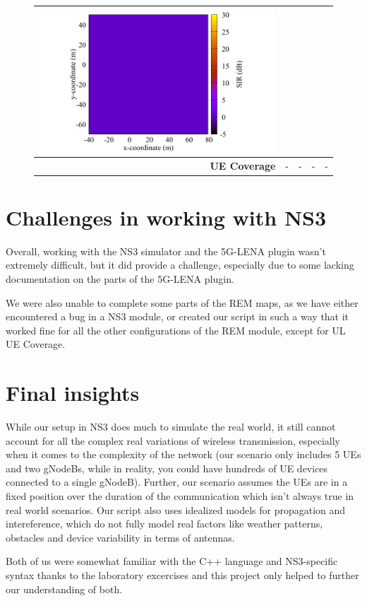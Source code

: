 \documentclass[10pt,a4]{article}
\begin{document}
\begin{figure}[h!]
{\begin{tabular}{r|cccc}
    \includegraphics[width=0.25\linewidth]{../kpm-plots/nr-rem-UL_COVERAGE_AREA-sir.pdf} \\
    \hline
    \textbf{UE Coverage} &
    - &
    - &
    - &
    - \\
    \end{tabular}}
    \end{figure}
    \section{Challenges in working with NS3}
    Overall, working with the NS3 simulator and the 5G-LENA plugin wasn't extremely difficult, but it did provide a challenge, especially due to some lacking documentation on the parts of the 5G-LENA plugin.

    We were also unable to complete some parts of the REM maps, as we have either encountered a bug in a NS3 module, or created our script in such a way that it worked fine for all the other configurations of the REM module, except for UL UE Coverage.
    \section{Final insights}
    While our setup in NS3 does much to simulate the real world, it still cannot account for all the complex real variations of wireless transmission, especially when it comes to the complexity of the network (our scenario only includes 5 UEs and two gNodeBs, while in reality, you could have hundreds of UE devices connected to a single gNodeB). Further, our scenario assumes the UEs are in a fixed position over the duration of the communication which isn't always true in real world scenarios. Our script also uses idealized models for propagation and intereference, which do not fully model real factors like weather patterns, obstacles and device variability in terms of antennas.

    Both of us were somewhat familiar with the C++ language and NS3-specific syntax thanks to the laboratory excercises and this project only helped to further our understanding of both.
\end{document}
